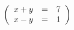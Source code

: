 \documentclass{article}
\begin{document}
\[
\begin{array}[c]({rcl})
x + y & = & 7 \\
x - y & = & 1
\end{array}
\]
\end{document}
